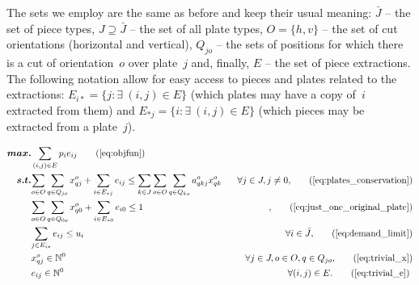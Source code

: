 The sets we employ are the same as before and keep their usual meaning: \(\bar{J}\) -- the set of piece types, \(J \supseteq \bar{J}\) -- the set of all plate types, \(O = \{h, v\}\) -- the set of cut orientations (horizontal and vertical), \(Q_{jo}\) -- the sets of positions for which there is a cut of orientation~\(o\) over plate~\(j\) and, finally, \(E\) -- the set of piece extractions.
The following notation allow for easy access to pieces and plates related to the extractions: \(E_{i*} = \{ j : \exists~(i, j) \in E \}\) (which plates may have a copy of~\(i\) extracted from them) and \(E_{*j} = \{i : \exists~(i, j) \in E \}\) (which pieces may be extracted from a plate~\(j\)).

\begin{align*}
\bm{max.} &\sum_{(i, j) \in E} p_i e_{ij} \tag{\ref{eq:objfun}}\\
\bm{s.t.} &\specialcell{\sum_{o \in O}\sum_{q \in Q_{jo}} x^o_{qj} + \sum_{i \in E_{*j}} e_{ij} \leq \sum_{k \in J}\sum_{o \in O}\sum_{q \in Q_{ko}} a^o_{qkj} x^o_{qk} \hspace*{0.05\textwidth} \forall j \in J, j \neq 0,}\tag{\ref{eq:plates_conservation}}\\
	    & \specialcell{\sum_{o \in O}\sum_{q \in Q_{0o}} x^o_{q0} + \sum_{i \in E_{*0}} e_{i0} \leq 1 \hspace*{\fill},}\tag{\ref{eq:just_one_original_plate}}\\
            & \specialcell{\sum_{j \in E_{i*}} e_{ij} \leq u_i \hspace*{\fill} \forall i \in \bar{J},}\tag{\ref{eq:demand_limit}}\\
	    & \specialcell{x^o_{qj} \in \mathbb{N}^0 \hspace*{\fill} \forall j \in J, o \in O, q \in Q_{jo},}\tag{\ref{eq:trivial_x}}\\
            & \specialcell{e_{ij} \in \mathbb{N}^0 \hspace*{\fill} \forall (i, j) \in E.}\tag{\ref{eq:trivial_e}}
\end{align*}

